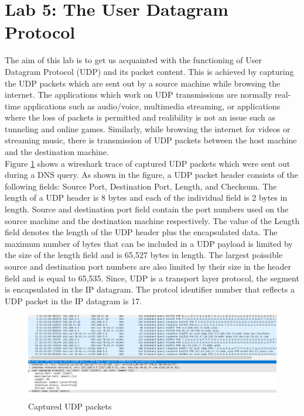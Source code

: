 \documentclass[10pt]{IEEEtran}
\begin{document}
\section{Lab 5: The User Datagram Protocol}
 The aim of this lab is to get us acquainted with the functioning of User Datagram Protocol (UDP) and its packet content. This is achieved by capturing the UDP packets which are sent out by a source machine while browsing the internet. The applications which work on UDP transmissions are normally real-time applications such as audio/voice, multimedia streaming, or applications where the loss of packets is permitted and realibility is not an issue such as tunneling and online games. Similarly, while browsing the internet for videos or streaming music, there is transmission of UDP packets between the host machine and the destination machine. \\
 Figure \ref{fig:udpCapture} shows a wireshark trace of captured UDP packets which were sent out during a DNS query. As shown in the figure, a UDP packet header consists of the following fields: Source Port, Destination Port, Length, and Checksum. The length of a UDP header is 8 bytes and each of the individual field is 2 bytes in length. Source and destination port field contain the port numbers used on the source machine and the destination machine respectively. The value of the Length field denotes the length of the UDP header plus the encapsulated data. The maximum number of bytes that can be included in a UDP payload is limited by the size of the length field and is 65,527 bytes in length. The largest poissible source and destination port numbers are also limited by their size in the header field and is equal to 65,535. Since, UDP is a transport layer protocol, the segment is encapsulated in the IP datagram. The protcol identifier number that reflects a UDP packet in the IP datagram is 17. \\

\begin{figure}[h!]
	\includegraphics[width=\linewidth]{udpCapture.png}
	\caption{Captured UDP packets}
	\label{fig:udpCapture}
\end{figure}
\end{document}
